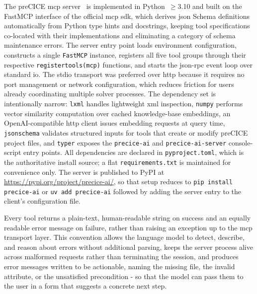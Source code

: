 \documentclass[
  numbers=noenddot,
  english,
  a4paper,
  twoside,
  bibliography=totoc,
  headsepline,
  cleardoublepage=empty,
  parskip=half,
  draft=false
]{scrbook}
\theoremstyle{break}
\renewcommand{\_}{\textunderscore\allowbreak}
\begin{document}
The preCICE \gls{mcp} server~\cite{dange2026preciceai} is implemented in Python~$\geq$3.10
and built on the FastMCP interface of the official \gls{mcp} \gls{sdk}, which derives
\gls{json} Schema definitions automatically from Python type hints and docstrings, keeping
tool specifications co-located with their implementations and eliminating a category of schema
maintenance errors. The server entry point loads environment configuration, constructs a
single \texttt{FastMCP} instance, registers all five tool groups through their respective
\texttt{register\_*\_tools(mcp)} functions, and starts the \gls{json}-\gls{rpc} event loop
over standard \gls{io}. The stdio transport was preferred over \gls{http} because it requires
no port management or network configuration, which reduces friction for users already
coordinating multiple solver processes. The dependency set is intentionally narrow:
\texttt{lxml} handles lightweight \gls{xml} inspection, \texttt{numpy} performs vector
similarity computation over cached knowledge-base embeddings, an OpenAI-compatible \gls{http}
client issues embedding requests at query time, \texttt{jsonschema} validates structured
inputs for tools that create or modify preCICE project files, and \texttt{typer} exposes the
\texttt{precice-ai} and \texttt{precice-ai-server} console-script entry points. All
dependencies are declared in \texttt{pyproject.toml}, which is the authoritative install
source; a flat \texttt{requirements.txt} is maintained for convenience only. The server is
published to PyPI at \url{https://pypi.org/project/precice-ai/}, so that setup reduces to
\texttt{pip install precice-ai} or \texttt{uv add precice-ai} followed by adding the server
entry to the client's configuration file.

Every tool returns a plain-text, human-readable string on success and an equally readable
error message on failure, rather than raising an exception up to the \gls{mcp} transport
layer. This convention allows the language model to detect, describe, and reason about errors
without additional parsing, keeps the server process alive across malformed requests rather
than terminating the session, and produces error messages written to be actionable, naming
the missing file, the invalid attribute, or the unsatisfied precondition - so that the
model can pass them to the user in a form that suggests a concrete next step.
\end{document}
